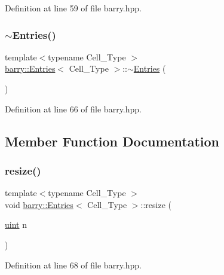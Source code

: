 Definition at line 59 of file barry.\+hpp.

\mbox{\label{classbarry_1_1_entries_a8d74af4d3b545fb79f9f4e8e894160cb}} 
\subsubsection{\texorpdfstring{$\sim$\+Entries()}{~Entries()}}
{\footnotesize\ttfamily template$<$typename Cell\+\_\+\+Type $>$ \\
\hyperlink{classbarry_1_1_entries}{barry\+::\+Entries}$<$ Cell\+\_\+\+Type $>$\+::$\sim$\hyperlink{classbarry_1_1_entries}{Entries} (\begin{DoxyParamCaption}{ }\end{DoxyParamCaption})\hspace{0.3cm}{\ttfamily [inline]}}



Definition at line 66 of file barry.\+hpp.



\subsection{Member Function Documentation}
\mbox{\label{classbarry_1_1_entries_a0c1e6fb0a6e2c462ba782433ac11e026}} 
\subsubsection{\texorpdfstring{resize()}{resize()}}
{\footnotesize\ttfamily template$<$typename Cell\+\_\+\+Type $>$ \\
void \hyperlink{classbarry_1_1_entries}{barry\+::\+Entries}$<$ Cell\+\_\+\+Type $>$\+::resize (\begin{DoxyParamCaption}\item[{\hyperlink{namespacebarry_a11dfc53ddb4672278319aa04f1e09a6c}{uint}}]{n }\end{DoxyParamCaption})\hspace{0.3cm}{\ttfamily [inline]}}



Definition at line 68 of file barry.\+hpp.



